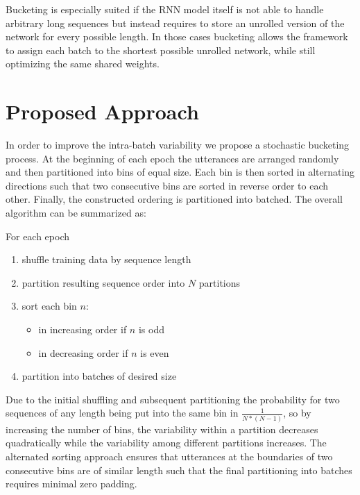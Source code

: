 \documentclass{article}
\begin{document}
  Bucketing is especially suited if the RNN model itself is not able to handle arbitrary 
  long sequences but instead requires to store an unrolled version of the network for every possible 
  length. In those cases bucketing allows the framework to assign each batch to the shortest possible 
  unrolled network, while still optimizing the same shared weights.

  \section{Proposed Approach} \label{sec:approach}
  
  In order to improve the intra-batch variability we propose a stochastic bucketing process. At the beginning
  of each epoch the utterances are arranged randomly and then partitioned into bins of equal size. Each bin
  is then sorted in alternating directions such that two consecutive bins are sorted in reverse order to each 
  other. Finally, the constructed ordering is partitioned into batched. The overall algorithm can be summarized as: \\[1ex]
 
 \begin{minipage}{\textwidth}
 	For each epoch
 	\begin{enumerate}
 		\item shuffle training data by sequence length
 		\item partition resulting sequence order into $N$ partitions
 		\item sort each bin $n$:
 		\begin{itemize}
 			\item in increasing order if $n$ is odd
 			\item in decreasing order if $n$ is even
 		\end{itemize}
 		\item partition into batches of desired size \\[1ex]
 	\end{enumerate}
 \end{minipage}

 Due to the initial shuffling and subsequent partitioning the probability for two sequences of any length being 
 put into the same bin in $\frac{1}{N*(N-1)}$, so by increasing the number of bins, the variability within a 
 partition decreases quadratically while the variability among different partitions increases. The alternated
 sorting approach ensures that utterances at the boundaries of two consecutive bins are of similar length such 
 that the final partitioning into batches requires minimal zero padding.
\end{document}
